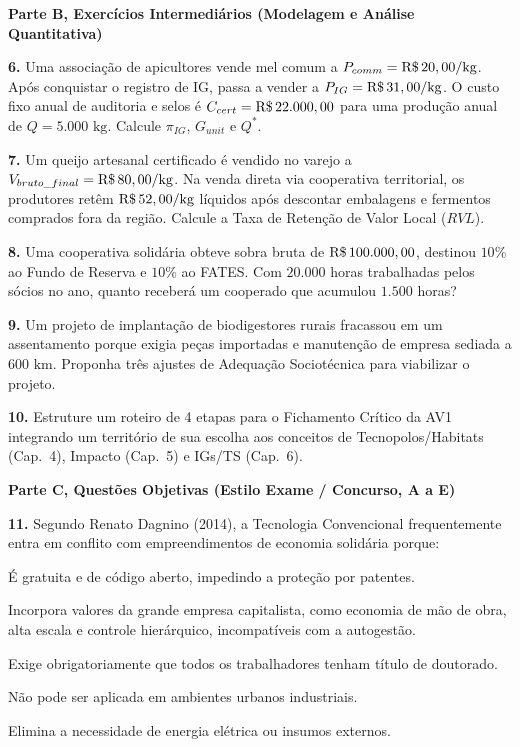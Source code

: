 \textbf{Parte B, Exercícios Intermediários (Modelagem e Análise Quantitativa)}

\textbf{6.} Uma associação de apicultores vende mel comum a $P_{comm} = \text{R\$\,}{20,00}/\text{kg}$. Após conquistar o registro de IG, passa a vender a $P_{IG} = \text{R\$\,}{31,00}/\text{kg}$. O custo fixo anual de auditoria e selos é $C_{cert} = \text{R\$\,}{22.000,00}$ para uma produção anual de $Q = 5.000\text{ kg}$. Calcule $\pi_{IG}$, $G_{unit}$ e $Q^*$.
\espacoResolucao[2.0cm]

\textbf{7.} Um queijo artesanal certificado é vendido no varejo a $V_{bruto\_final} = \text{R\$\,}{80,00}/\text{kg}$. Na venda direta via cooperativa territorial, os produtores retêm $\text{R\$\,}{52,00}/\text{kg}$ líquidos após descontar embalagens e fermentos comprados fora da região. Calcule a Taxa de Retenção de Valor Local ($RVL$).
\espacoResolucao[2.0cm]

\textbf{8.} Uma cooperativa solidária obteve sobra bruta de $\text{R\$\,}{100.000,00}$, destinou $10\%$ ao Fundo de Reserva e $10\%$ ao FATES. Com $20.000$ horas trabalhadas pelos sócios no ano, quanto receberá um cooperado que acumulou $1.500$ horas?
\espacoResolucao[2.0cm]

\textbf{9.} Um projeto de implantação de biodigestores rurais fracassou em um assentamento porque exigia peças importadas e manutenção de empresa sediada a $600\text{ km}$. Proponha três ajustes de Adequação Sociotécnica para viabilizar o projeto.
\espacoResolucao[2.0cm]

\textbf{10.} Estruture um roteiro de 4 etapas para o Fichamento Crítico da AV1 integrando um território de sua escolha aos conceitos de Tecnopolos/Habitats (Cap.~4), Impacto (Cap.~5) e IGs/TS (Cap.~6).
\espacoResolucao[2.0cm]

\textbf{Parte C, Questões Objetivas (Estilo Exame / Concurso, A a E)}

\textbf{11.} Segundo Renato Dagnino (2014), a Tecnologia Convencional frequentemente entra em conflito com empreendimentos de economia solidária porque:
\begin{alternativas}
  \item É gratuita e de código aberto, impedindo a proteção por patentes.
  \item Incorpora valores da grande empresa capitalista, como economia de mão de obra, alta escala e controle hierárquico, incompatíveis com a autogestão.
  \item Exige obrigatoriamente que todos os trabalhadores tenham título de doutorado.
  \item Não pode ser aplicada em ambientes urbanos industriais.
  \item Elimina a necessidade de energia elétrica ou insumos externos.
\end{alternativas}


